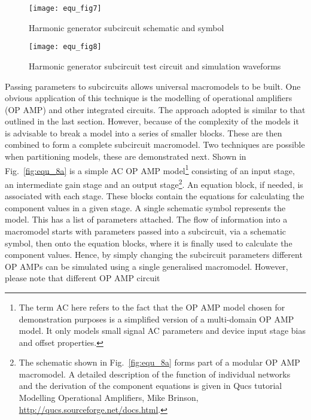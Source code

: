 \begin{figure}
  \centering
  \texttt{[image: equ\_fig7]}
  \caption{Harmonic generator subcircuit schematic and symbol} 
  \label{fig:equ_7}
\end{figure} 

\begin{figure}
  \centering
  \texttt{[image: equ\_fig8]}
  \caption{Harmonic generator subcircuit test circuit and simulation waveforms}
  \label{fig:equ_8}
\end{figure} 


Passing parameters to subcircuits allows universal macromodels to be
built. One obvious application of this technique is the modelling of
operational amplifiers (OP AMP) and other integrated circuits.  The
approach adopted is similar to that outlined in the last section.
However, because of the complexity of the models it is advisable to
break a model into a series of smaller blocks. These are then combined
to form a complete subcircuit macromodel. Two techniques are possible
when partitioning models, these are demonstrated next. Shown in
Fig.~\ref{fig:equ_8a} is a simple AC OP AMP model\footnote{The term AC
here refers to the fact that the OP AMP model chosen for demonstration
purposes is a simplified version of a multi-domain OP AMP model. It
only models small signal AC parameters and device input stage bias and
offset properties.} consisting of an input stage, an intermediate gain
stage and an output stage\footnote{The schematic shown in
Fig.~\ref{fig:equ_8a} forms part of a modular OP AMP macromodel. A
detailed description of the function of individual networks and the
derivation of the component equations is given in Qucs tutorial
Modelling Operational Amplifiers, Mike Brinson,
\url{http://qucs.sourceforge.net/docs.html}.}. An equation block, if needed,
is associated with each stage. These blocks contain the equations for
calculating the component values in a given stage. A single schematic
symbol represents the model. This has a list of parameters
attached. The flow of information into a macromodel starts with
parameters passed into a subcircuit, via a schematic symbol, then onto
the equation blocks, where it is finally used to calculate the
component values.  Hence, by simply changing the subcircuit parameters
different OP AMPs can be simulated using a single generalised
macromodel. However, please note that different OP AMP circuit
